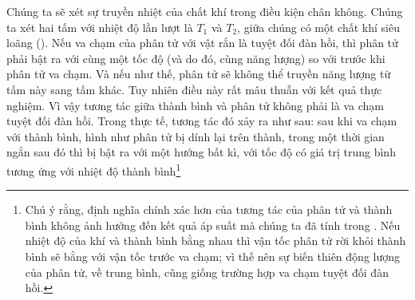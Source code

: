 Chúng ta sẽ xét sự truyền nhiệt của chất khí trong điều kiện chân không. Chúng ta xét hai tấm với nhiệt độ lần lượt là $T_1$ và $T_2$, giữa chúng có một chất khí siêu loãng (). Nếu va chạm của phân tử với vật rắn là tuyệt đối đàn hồi, thì phân tử phải bật ra với cùng một tốc độ (và do đó, cùng năng lượng) so với trước khi phân tử va chạm. Và nếu như thế, phân tử sẽ không thể truyền năng lượng từ tấm này sang tấm khác. Tuy nhiên điều này rất mâu thuẫn với kết quả thực nghiệm. Vì vậy tương tác giữa thành bình và phân tử không phải là va chạm tuyệt đối đàn hồi. Trong thực tế, tương tác đó xảy ra như sau: sau khi va chạm với thành bình, hình như phân tử bị dính lại trên thành, trong một thời gian ngắn sau đó thì bị bật ra với một hướng bất kì, với tốc độ có giá trị trung bình tương ứng với nhiệt độ thành bình\footnote{Chú ý rằng, định nghĩa chính xác hơn của tương tác của phân tử và thành bình không ảnh hưởng đến kết quả áp suất mà chúng ta đã tính trong . Nếu nhiệt độ của khí và thành bình bằng nhau thì vận tốc phân tử rời khỏi thành bình sẽ bằng với vận tốc trước va chạm; vì thế nên sự biến thiên động lượng của phân tử, về trung bình, cũng giống trường hợp va chạm tuyệt đối đàn hồi.}

